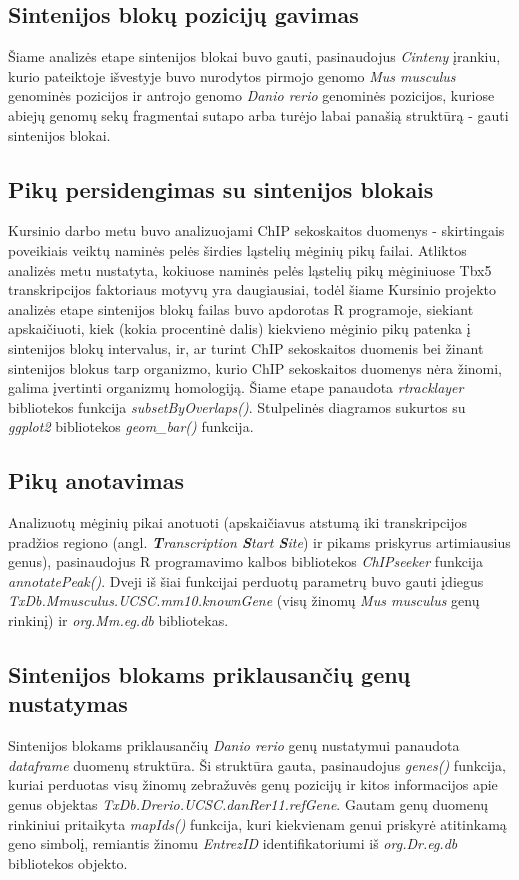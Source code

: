 \documentclass[12pt]{article}
\begin{document}
\subsection{Sintenijos blokų pozicijų gavimas}
Šiame analizės etape sintenijos blokai buvo gauti, pasinaudojus \emph{Cinteny}
įrankiu, kurio pateiktoje išvestyje buvo nurodytos pirmojo genomo
\emph{Mus musculus} genominės pozicijos ir antrojo genomo \emph{Danio rerio}
genominės pozicijos, kuriose abiejų genomų sekų fragmentai sutapo arba turėjo
labai panašią struktūrą - gauti sintenijos blokai.

\subsection{Pikų persidengimas su sintenijos blokais}
Kursinio darbo metu buvo analizuojami ChIP sekoskaitos duomenys - skirtingais
poveikiais veiktų naminės pelės širdies ląstelių mėginių pikų failai. Atliktos
analizės metu nustatyta, kokiuose naminės pelės ląstelių pikų mėginiuose Tbx5
transkripcijos faktoriaus motyvų yra daugiausiai, todėl šiame Kursinio projekto
analizės etape sintenijos blokų failas buvo apdorotas R programoje, siekiant
apskaičiuoti, kiek (kokia procentinė dalis) kiekvieno mėginio pikų patenka į
sintenijos blokų intervalus, ir, ar turint ChIP sekoskaitos duomenis bei
žinant sintenijos blokus tarp organizmo, kurio ChIP sekoskaitos duomenys nėra
žinomi, galima įvertinti organizmų homologiją. Šiame etape panaudota
\emph{rtracklayer}\cite{R_TRACK} bibliotekos funkcija \emph{subsetByOverlaps()}.
Stulpelinės diagramos sukurtos su \emph{ggplot2}\cite{R_GGPLOT} bibliotekos
\emph{geom\_bar()} funkcija.

\subsection{Pikų anotavimas}
Analizuotų mėginių pikai anotuoti (apskaičiavus atstumą iki transkripcijos
pradžios regiono (angl. \emph{\textbf{T}ranscription \textbf{S}tart
\textbf{S}ite}) ir pikams priskyrus artimiausius genus), pasinaudojus R
programavimo kalbos bibliotekos \emph{ChIPseeker}\cite{CHIP1, CHIP2} funkcija
\emph{annotatePeak()}. Dveji iš šiai funkcijai perduotų parametrų buvo gauti
įdiegus \emph{TxDb.Mmusculus.UCSC.mm10.knownGene}\cite{KNOWN_GENE} (visų žinomų
\emph{Mus musculus} genų rinkinį) ir \emph{org.Mm.eg.db}\cite{MM_ANNOT}
bibliotekas.

\subsection{Sintenijos blokams priklausančių genų nustatymas}
Sintenijos blokams priklausančių \emph{Danio rerio} genų nustatymui panaudota
\emph{dataframe} duomenų struktūra. Ši struktūra gauta, pasinaudojus
\emph{genes()} funkcija, kuriai perduotas visų žinomų zebražuvės genų pozicijų
ir kitos informacijos apie genus objektas
\emph{TxDb.Drerio.UCSC.danRer11.\-refGene}\cite{REF_GENE}. Gautam genų duomenų
rinkiniui pritaikyta \emph{mapIds()} funkcija, kuri kiekvienam genui priskyrė
atitinkamą geno simbolį, remiantis žinomu \emph{EntrezID} identifikatoriumi iš
\emph{org.Dr.eg.db}\cite{DR_ANNOT} bibliotekos objekto.
\end{document}
